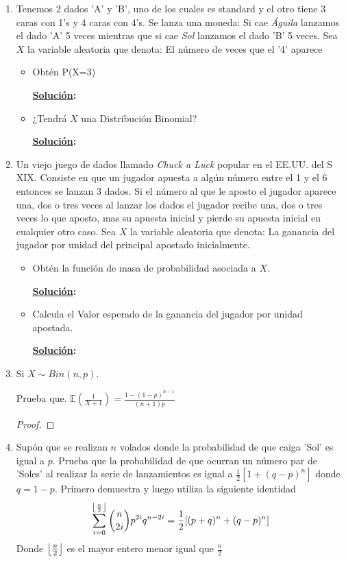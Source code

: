 \documentclass[11pt,letterpaper]{report}
\DeclarePairedDelimiter\floor{\lfloor}{\rfloor}
\newcommand{\sol}{\textbf{\underline{Solución}: }} %
\begin{document}
\begin{enumerate}
\item Tenemos 2 dados 'A' y 'B', uno de los cuales es standard y el otro tiene 3 caras con 1's y 4
caras con 4's. Se lanza una moneda: Si cae \emph{Águila} lanzamos el dado 'A' 5 veces mientras que si cae
\emph{Sol} lanzamos el dado 'B' 5 veces. Sea $X$ la variable aleatoria que denota: El número de veces que
el '4' aparece

\begin{itemize}
    \item Obtén P(X=3)
    
    \sol

    \item ¿Tendrá $X$ una Distribución Binomial?
    
    \sol
    
\end{itemize}

\item Un viejo juego de dados llamado \emph{Chuck a Luck} popular en el EE.UU. del S XIX. Consiste en que
un jugador apuesta a algún número entre el 1 y el 6 entonces se lanzan 3 dados. Si el número al que le aposto el jugador
aparece una, dos o tres veces al lanzar los dados el jugador recibe una, dos o tres veces lo que aposto, mas su apuesta
inicial y pierde su apuesta inicial en cualquier otro caso. Sea $X$ la variable aleatoria que denota: La ganancia del
jugador por unidad del principal apostado inicialmente.

\begin{itemize}
    \item Obtén la función de masa de probabilidad asociada a $X$.
    
    \sol

    \item Calcula el Valor esperado de la ganancia del jugador por unidad apostada.
    
    \sol
    
\end{itemize}

\item Si $X \sim Bin(n, p)$.

Prueba que. $\mathds{E}(\frac{1}{X+1}) = \frac{1-(1-p)^{n-1}}{(n+1)p}$

\begin{proof}
    
\end{proof}

\item Supón que se realizan $n$ volados donde la probabilidad de que caiga 'Sol' es igual a $p$.
Prueba que la probabilidad de que ocurran un número par de 'Soles' al realizar la serie de lanzamientos es igual a
$\frac{1}{2}[1+(q-p)^n]$ donde $q=1-p$. Primero demuestra y luego utiliza la siguiente identidad
\[
    \sum_{i=0}^{\floor*{\frac{n}{2}}} \binom{n}{2i} p^{2i} q^{n-2i} = 
        \frac{1}{2}[(p+q)^n + (q-p)^n]
\]
Donde $\floor*{\frac{n}{2}}$ es el mayor entero menor igual que $\frac{n}{2}$


\end{enumerate}
\end{document}
